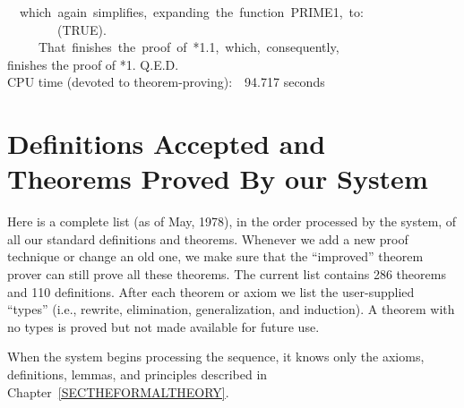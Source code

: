 \documentclass[10pt]{book}
\newenvironment{pubasis}{\begin{flushleft}}{\end{flushleft}}
\begin{document}
\begin{pubasis}
~~which~again~simplifies,~expanding~the~function~PRIME1,~to:\\

~~~~~~~~(TRUE).\\

~~~~~That~finishes~the~proof~of~*1.1,~which,~consequently,\\
finishes the proof of *1.  Q.E.D.\\

CPU time (devoted to theorem-proving):~~94.717 seconds\\
\end{pubasis}
\appendix
\chapter{Definitions Accepted and Theorems Proved By our System}
\pagestyle{headings}
\label{APPTHMS}
Here is a complete list (as of May, 1978), in the order processed by
the system, of all our standard definitions and theorems.
Whenever we add a new proof technique or change an old one, we
make sure that the ``improved'' theorem prover can still prove all
these theorems.  The current list contains 286 theorems and 110 definitions.
After each theorem or axiom
we list the user-supplied ``types'' (i.e., rewrite, elimination,
generalization, and induction).  A theorem with no types
is proved but not made available for future use.

When the system begins processing the sequence, it knows only the axioms,
definitions, lemmas, and principles described in Chapter~\ref{SECTHEFORMALTHEORY}.
\end{document}
